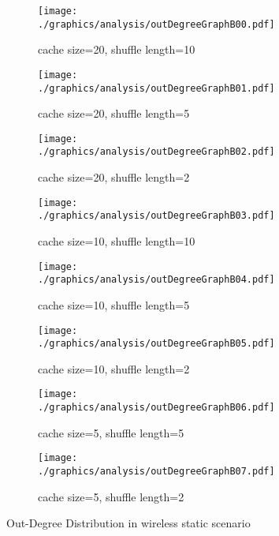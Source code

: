 \begin{figure}
\begin{subfigure}{.5\textwidth}
	\texttt{[image: ./graphics/analysis/outDegreeGraphB00.pdf]}
	\caption{cache size=20, shuffle
	length=10}
	\label{fig:outDegreeDistB00small}
\end{subfigure}%
\begin{subfigure}{.5\textwidth}
	\texttt{[image: ./graphics/analysis/outDegreeGraphB01.pdf]}
	\caption{cache size=20, shuffle
	length=5}
	\label{fig:outDegreeDistB01small}
\end{subfigure}
\begin{subfigure}{.5\textwidth}
	\texttt{[image: ./graphics/analysis/outDegreeGraphB02.pdf]} \caption{cache size=20, shuffle length=2}
	\label{fig:outDegreeDistB02small}
\end{subfigure}%
\begin{subfigure}{.5\textwidth}
	\texttt{[image: ./graphics/analysis/outDegreeGraphB03.pdf]}
	\caption{cache size=10, shuffle
	length=10}
	\label{fig:outDegreeDistB03small}
\end{subfigure}
\begin{subfigure}{.5\textwidth}
	\texttt{[image: ./graphics/analysis/outDegreeGraphB04.pdf]}
	\caption{cache size=10, shuffle
	length=5}
	\label{fig:outDegreeDistB04small}
\end{subfigure}%
\begin{subfigure}{.5\textwidth}
	\texttt{[image: ./graphics/analysis/outDegreeGraphB05.pdf]}
	\caption{cache size=10, shuffle
	length=2}
	\label{fig:outDegreeDistB05small}
\end{subfigure}
\begin{subfigure}{.5\textwidth}
	\texttt{[image: ./graphics/analysis/outDegreeGraphB06.pdf]}
	\caption{cache size=5, shuffle
	length=5}
	\label{fig:outDegreeDistB06small}
\end{subfigure}%
\begin{subfigure}{.5\textwidth}
	\texttt{[image: ./graphics/analysis/outDegreeGraphB07.pdf]}
	\caption{cache size=5, shuffle
	length=2}
	\label{fig:outDegreeDistB07small}
\end{subfigure}
\caption{Out-Degree Distribution in wireless static scenario}
\end{figure}


